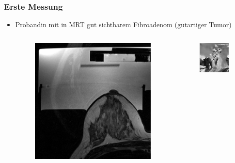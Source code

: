 \documentclass{beamer}
\begin{document}
    \begin{frame}
        \frametitle{Erste Messung}
        \begin{itemize}
            \item 
                Probandin mit in MRT gut sichtbarem Fibroadenom (gutartiger Tumor)
                \begin{columns}
                    \begin{figure}
                        \centering
                        \includegraphics[width=.8\textwidth]{../Abbildungen/2014-11-27_9_7_amp.png}
                    \end{figure}
                    \begin{figure}
                        \centering
                        \includegraphics[width=.8\textwidth]{../Abbildungen/2014-11-27_19_1_phase.png}
                    \end{figure}
                \end{columns}
        \end{itemize}
    \end{frame}
\end{document}
